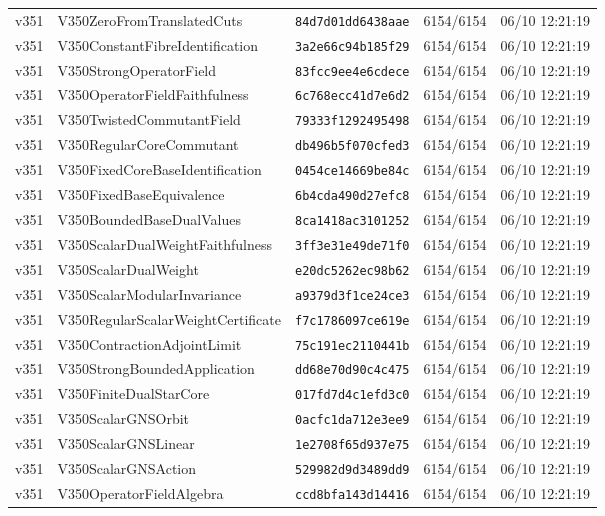 \documentclass[11pt]{article}
\theoremstyle{definition}\newtheorem{deriv}{Derivation}
\begin{document}
{\begin{longtable}{@{}lllll@{}}
v351 & V350ZeroFromTranslatedCuts & \texttt{84d7d01dd6438aae} & 6154/6154 & 06/10 12:21:19 \\
v351 & V350ConstantFibreIdentification & \texttt{3a2e66c94b185f29} & 6154/6154 & 06/10 12:21:19 \\
v351 & V350StrongOperatorField & \texttt{83fcc9ee4e6cdece} & 6154/6154 & 06/10 12:21:19 \\
v351 & V350OperatorFieldFaithfulness & \texttt{6c768ecc41d7e6d2} & 6154/6154 & 06/10 12:21:19 \\
v351 & V350TwistedCommutantField & \texttt{79333f1292495498} & 6154/6154 & 06/10 12:21:19 \\
v351 & V350RegularCoreCommutant & \texttt{db496b5f070cfed3} & 6154/6154 & 06/10 12:21:19 \\
v351 & V350FixedCoreBaseIdentification & \texttt{0454ce14669be84c} & 6154/6154 & 06/10 12:21:19 \\
v351 & V350FixedBaseEquivalence & \texttt{6b4cda490d27efc8} & 6154/6154 & 06/10 12:21:19 \\
v351 & V350BoundedBaseDualValues & \texttt{8ca1418ac3101252} & 6154/6154 & 06/10 12:21:19 \\
v351 & V350ScalarDualWeightFaithfulness & \texttt{3ff3e31e49de71f0} & 6154/6154 & 06/10 12:21:19 \\
v351 & V350ScalarDualWeight & \texttt{e20dc5262ec98b62} & 6154/6154 & 06/10 12:21:19 \\
v351 & V350ScalarModularInvariance & \texttt{a9379d3f1ce24ce3} & 6154/6154 & 06/10 12:21:19 \\
v351 & V350RegularScalarWeightCertificate & \texttt{f7c1786097ce619e} & 6154/6154 & 06/10 12:21:19 \\
v351 & V350ContractionAdjointLimit & \texttt{75c191ec2110441b} & 6154/6154 & 06/10 12:21:19 \\
v351 & V350StrongBoundedApplication & \texttt{dd68e70d90c4c475} & 6154/6154 & 06/10 12:21:19 \\
v351 & V350FiniteDualStarCore & \texttt{017fd7d4c1efd3c0} & 6154/6154 & 06/10 12:21:19 \\
v351 & V350ScalarGNSOrbit & \texttt{0acfc1da712e3ee9} & 6154/6154 & 06/10 12:21:19 \\
v351 & V350ScalarGNSLinear & \texttt{1e2708f65d937e75} & 6154/6154 & 06/10 12:21:19 \\
v351 & V350ScalarGNSAction & \texttt{529982d9d3489dd9} & 6154/6154 & 06/10 12:21:19 \\
v351 & V350OperatorFieldAlgebra & \texttt{ccd8bfa143d14416} & 6154/6154 & 06/10 12:21:19 \\

\end{longtable}}
\end{document}
